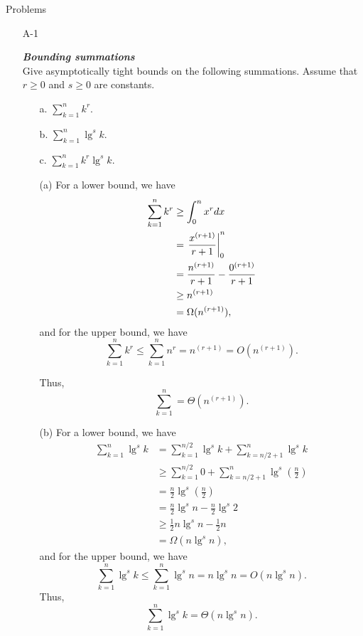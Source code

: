 \newpage

{\large Problems}

\begin{enumerate}

\item[A{-}1]{\textbf{\emph{Bounding summations}}\\
Give asymptotically tight bounds on the following summations. Assume that
$r \ge 0$ and $s \ge 0$ are constants.
\begin{enumerate}
  \item[a.] $\sum_{k = 1}^{n} k^r$.
  \item[b.] $\sum_{k = 1}^{n} \lg^s k$.
  \item[c.] $\sum_{k = 1}^{n} k^r \lg^s k$.
\end{enumerate}
}

\begin{framed}
\begin{enumerate}
\item[(a)] For a lower bound, we have
\begin{equation*}
\begin{aligned}
  \sum_{k = 1}^{n} k^r &\ge \int_{0}^{n} x^r dx\\
                       &=   \left.\frac{x^{(r + 1)}}{r + 1}\right\rvert_{0}^{n}\\
                       &=   \frac{n^{(r + 1)}}{r + 1} - \frac{0^{(r + 1)}}{r + 1}\\
                       &\ge n^{(r + 1)}\\
                       &=   \Omega(n^{(r + 1)}),
\end{aligned}
\end{equation*}
and for the upper bound, we have
\[
  \sum_{k = 1}^{n} k^r \le \sum_{k = 1}^{n} n^r = n^{(r + 1)} = O(n^{(r + 1)}).
\]

Thus,
\[
  \sum_{k = 1}^{n} = \Theta(n^{(r + 1)}).
\]

\item[(b)] For a lower bound, we have
\begin{equation*}
\begin{aligned}
  \sum_{k = 1}^{n} \lg^{s} k &=   \sum_{k = 1}^{n/2} \lg^{s} k + \sum_{k = n/2 + 1}^{n} \lg^{s} k\\
                             &\ge \sum_{k = 1}^{n/2} 0 + \sum_{k = n/2 + 1}^{n} \lg^{s}{\left(\frac{n}{2}\right)}\\
                             &=   \frac{n}{2} \lg^{s}{\left(\frac{n}{2}\right)}\\
                             &=   \frac{n}{2} \lg^{s}{n} - \frac{n}{2} \lg^{s}{2}\\
                             &\ge \frac{1}{2} n \lg^{s} n - \frac{1}{2} n\\
                             &=   \Omega(n \lg^s n),
\end{aligned}
\end{equation*}
and for the upper bound, we have
\[
  \sum_{k = 1}^{n} \lg^{s} k \le \sum_{k = 1}^{n} \lg^{s} n = n \lg^s n = O(n \lg^s n).
\]
Thus,
\[
  \sum_{k = 1}^{n} \lg^{s} k = \Theta(n \lg^s n).
\]


\end{enumerate}
\end{framed}
\end{enumerate}

